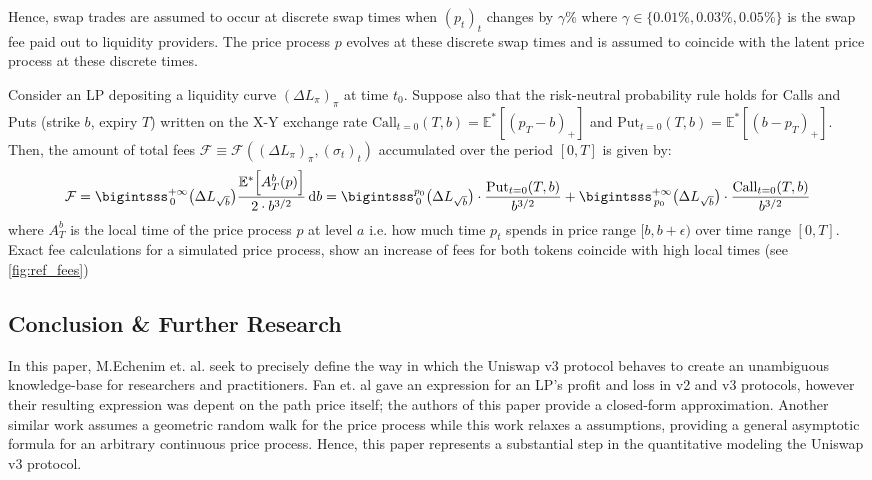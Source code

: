 \documentclass[11pt, letterpaper]{article}
\renewcommand{\d}{\textrm{d}}
\begin{document}
Hence, swap trades are assumed to occur at discrete swap times when $(p_t)_t$ changes by $\gamma\%$ where $\gamma\in\{0.01\%,0.03\%,0.05\%\}$ is the swap fee paid out to liquidity providers. The price process $p$ evolves at these discrete swap times and is assumed to coincide with the latent price process at these discrete times.

Consider an LP depositing a liquidity curve $(\Delta L_\pi)_\pi$ at time $t_0$. 
Suppose also that the risk-neutral probability rule holds for Calls and Puts (strike $b$, expiry $T$) written on the X-Y exchange rate $\textrm{Call}_{t=0}(T,b)=\mathbb{E}^*[(p_T-b)_+]$ and $\textrm{Put}_{t=0}(T,b)=\mathbb{E}^*[(b-p_T)_+]$. 
Then, the amount of total fees $\mathcal{F}\equiv\mathcal{F}((\Delta L_\pi)_\pi,(\sigma_t)_t)$ accumulated over the period $[0,T]$ is given by:
\begin{equation}
\label{eq:fees}
\mathcal{F}=\bigintsss_{\,0}^{+\infty} \bigl(\Delta L_{\sqrt{b}}\bigr) \frac{\mathbb{E}^*\Bigl[A^b_T(p)\Bigr]}{2\cdot b^{3/2}} \,\d b =
\bigintsss_{\, 0}^{p_0} \bigl(\Delta L_{\sqrt{b}}\bigr)\cdot\frac{\textrm{Put}_{t=0}(T,b)}{b^{3/2}} + \bigintsss_{\, p_0}^{+\infty} \bigl(\Delta L_{\sqrt{b}}\bigr)\cdot\frac{\textrm{Call}_{t=0}(T,b)}{b^{3/2}} 
\end{equation}
where $A_T^b$ is the local time of the price process $p$ at level $a$ i.e. how much time $p_t$ spends in price range $[b,b+\epsilon)$ over time range $[0,T]$. 
Exact fee calculations for a simulated price process, show an increase of fees for both tokens coincide with high local times (see \cref{fig:ref_fees})


\subsection*{Conclusion \& Further Research}
In this paper, M.Echenim et. al. seek to precisely define the way in which the Uniswap v3 protocol behaves to create an unambiguous knowledge-base for researchers and practitioners. Fan et. al gave an expression for an LP's profit and loss in v2 and v3 protocols, however their resulting expression was depent on the path price itself; the authors of this paper provide a closed-form approximation. Another similar work assumes a geometric random walk for the price process while this work relaxes a assumptions, providing a general asymptotic formula for an arbitrary continuous price process.
Hence, this paper represents a substantial step in the quantitative modeling the Uniswap v3 protocol.
\end{document}
